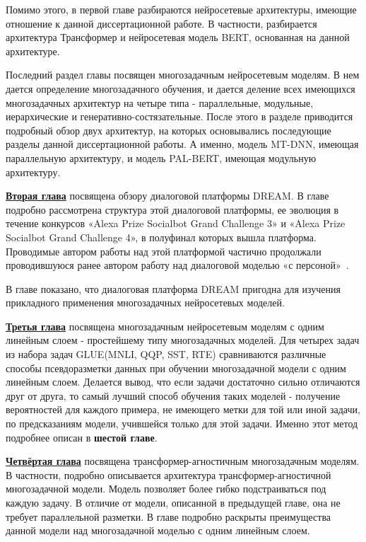 Помимо этого, в первой главе разбираются нейросетевые архитектуры, имеющие отношение к данной диссертационной работе. В частности, разбирается архитектура Трансформер и нейросетевая модель {BERT}, основанная на данной архитектуре. 

Последний раздел главы посвящен многозадачным нейросетевым моделям. В нем дается определение многозадачного обучения, и дается деление всех имеющихся многозадачных архитектур на четыре типа - параллельные, модульные, иерархические и генеративно-состязательные. После этого в разделе приводится подробный обзор двух архитектур, на которых основывались последующие разделы данной диссертационной работы. А именно, модель {MT-DNN}, имеющая параллельную архитектуру, и модель {PAL-BERT}, имеющая модульную архитектуру. 

\underline{\textbf{Вторая глава}} посвящена обзору диалоговой платформы DREAM. В главе подробно рассмотрена структура этой диалоговой платформы, ее эволюция в течение конкурсов «Alexa Prize Socialbot Grand Challenge 3» и «Alexa Prize Socialbot Grand Challenge 4», в полуфинал которых вышла платформа.  Проводимые автором работы над этой платформой частично продолжали проводившуюся ранее автором работу над диалоговой моделью «с персоной»~\cite{Болотин_Карпов_Рашков_Шкурак_2019}.

В главе показано, что диалоговая платформа DREAM пригодна для изучения прикладного применения многозадачных нейросетевых моделей.

\underline{\textbf{Третья глава}} посвящена многозадачным нейросетевым моделям с одним линейным слоем - простейшему типу многозадачных моделей. Для четырех задач из набора задач GLUE(MNLI, QQP, SST, RTE) сравниваются различные способы псевдоразметки данных при обучении многозадачной модели с одним линейным слоем. Делается вывод, что если задачи достаточно сильно отличаются друг от друга, то самый лучший способ обучения таких моделей - получение вероятностей для каждого примера, не имеющего метки для той или иной задачи, по предсказаниям модели, учившейся только для этой задачи. Именно этот метод подробнее описан в \textbf{шестой главе}.

\underline{\textbf{Четвёртая глава}} посвящена трансформер-агностичным многозадачным моделям. В частности, подробно описывается архитектура трансформер-агностичной многозадачной модели. Модель позволяет более гибко подстраиваться под каждую задачу. В отличие от модели, описанной в предыдущей главе, она не требует параллельной разметки. В главе подробно раскрыты преимущества данной модели над многозадачной моделью с одним линейным слоем.

